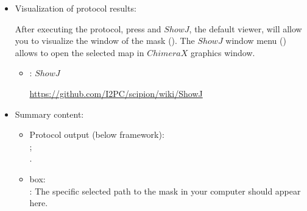 \begin{itemize}
        \item Visualization of protocol results:
  
            After executing the protocol, press  and $ShowJ$, the default \scipion viewer, will allow you to visualize the  window of the mask  (). The $ShowJ$ window menu () allows to open the selected map in $ChimeraX$ graphics window.
   
            \begin{itemize}
                \item {}: $ShowJ$
                
                \url{https://github.com/I2PC/scipion/wiki/ShowJ}

            \end{itemize}
   
        \item Summary content:
    
            \begin{itemize}
            \item Protocol output (below \scipion framework):\\ ;\\ .
            \item {} box:\\: The specific selected path to the mask in your computer should appear here.
            \end{itemize}
  
  \end{itemize}

